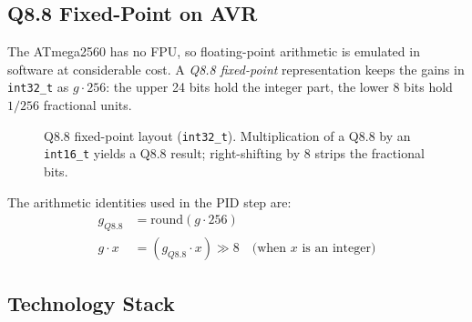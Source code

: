 \documentclass[12pt]{article}
\begin{document}
\subsection{Q8.8 Fixed-Point on AVR}

The ATmega2560 has no FPU, so floating-point arithmetic is emulated in software at considerable cost. A \emph{Q8.8 fixed-point} representation keeps the gains in \texttt{int32\_t} as $g \cdot 256$: the upper 24 bits hold the integer part, the lower 8 bits hold $1/256$ fractional units.

\begin{figure}[H]
\centering
{}
\caption{Q8.8 fixed-point layout (\texttt{int32\_t}). Multiplication of a Q8.8 by an \texttt{int16\_t} yields a Q8.8 result; right-shifting by 8 strips the fractional bits.}
\label{fig:q88}
\end{figure}

The arithmetic identities used in the PID step are:
\begin{align}
g_{Q8.8} &= \mathrm{round}(g \cdot 256) \\
g \cdot x &= (g_{Q8.8} \cdot x) \gg 8 \quad \text{(when $x$ is an integer)}
\end{align}

\subsection{Technology Stack}
\end{document}
